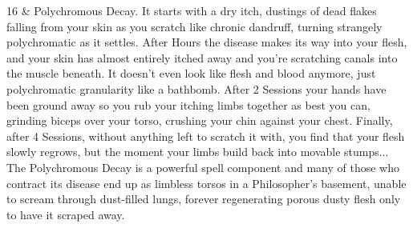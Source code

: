 {    16 &  Polychromous Decay. It starts with a dry itch, dustings of dead flakes falling from your skin as you scratch like chronic dandruff, turning strangely polychromatic as it settles. After Hours the disease makes its way into your flesh, and your skin has almost entirely itched away and you're scratching canals into the muscle beneath. It doesn't even look like flesh and blood anymore, just polychromatic granularity like a bathbomb.  After 2 Sessions your hands have been ground away so you rub your itching limbs together as best you can, grinding biceps over your torso, crushing your chin against your chest.  Finally, after 4 Sessions, without anything left to scratch it with, you find that your flesh slowly regrows, but the moment your limbs build back into movable stumps... The Polychromous Decay is a powerful spell component and many of those who contract its disease end up as limbless torsos in a Philosopher's basement, unable to scream through dust-filled lungs, forever regenerating porous dusty flesh only to have it scraped away.  \\
}

